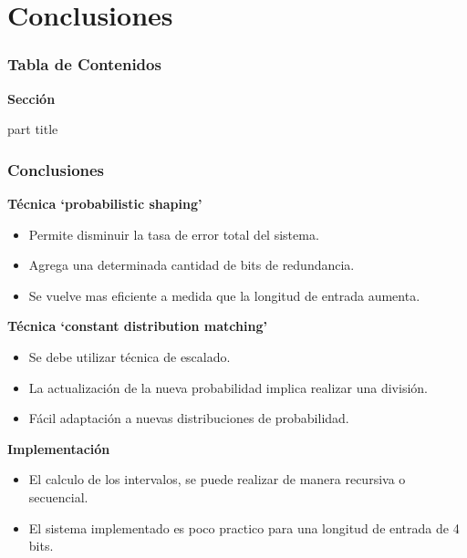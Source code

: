 


\section{ Conclusiones}
\begin{frame}
  \frametitle{\textbf{Tabla de Contenidos}}
  \begin{center}
    {\vspace{-1.5cm}\Large \textbf{Sección \thesection}\vspace{0.5cm}}
    \begin{beamercolorbox}[
      sep=8pt,center]{part title}
      \textbf{\insertsection}
    \end{beamercolorbox}
  \end{center}
\end{frame}


\begin{frame}
  \frametitle{\textbf{\textbf{Conclusiones}}}
    \begin{block}{\centering \textbf{Técnica `probabilistic shaping'}}
    \begin{itemize}\small
        \item Permite disminuir la tasa de error total del sistema.
        \item Agrega una determinada cantidad de bits de redundancia.
        \item Se vuelve mas eficiente a medida que la longitud de entrada aumenta.
    \end{itemize}
    \end{block}
    \vspace{-0.2cm}

    \begin{block}{\centering \textbf{Técnica `constant distribution matching'}}
       \begin{itemize}\small
        \item Se debe utilizar técnica de escalado.
        \item La actualización de la nueva probabilidad implica realizar una división.
        \item Fácil adaptación a nuevas distribuciones de probabilidad. 
    \end{itemize}
    \end{block}
    \vspace{-0.2cm}

    \begin{block}{\centering \textbf{Implementación}}
    \begin{itemize}\small
        \item El calculo de los intervalos, se puede realizar de manera recursiva o secuencial.
        \item  El sistema implementado es poco practico para una longitud de entrada de 4 bits. 
    \end{itemize}
    \end{block}
\end{frame}